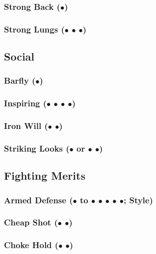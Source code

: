 \documentclass["../Misguided by Starlight.tex"]{subfiles}
\begin{document}
	\subsubsection{Strong Back ($\bullet$)} %
	
	\subsubsection{Strong Lungs ($\bullet$ $\bullet$ $\bullet$)} %
	
\subsection{Social}
	\subsubsection{Barfly ($\bullet$)} %
	
	\subsubsection{Inspiring ($\bullet$ $\bullet$ $\bullet$ $\bullet$)} %
	
	\subsubsection{Iron Will ($\bullet$ $\bullet$)} %
	
	\subsubsection{Striking Looks ($\bullet$ or $\bullet$ $\bullet$)} %
	
\subsection{Fighting Merits} %
	\subsubsection{Armed Defense ($\bullet$ to $\bullet$ $\bullet$ $\bullet$ $\bullet$ $\bullet$; Style)} %
	
	\subsubsection{Cheap Shot ($\bullet$ $\bullet$)} %
	
	\subsubsection{Choke Hold ($\bullet$ $\bullet$)} %
	
\end{document}
